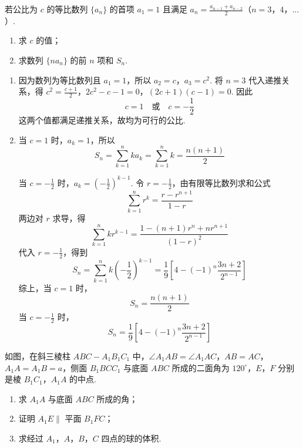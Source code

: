 \begin{problem}
若公比为 \(c\) 的等比数列 \(\{a_{n}\}\) 的首项 \(a_1 = 1\) 且满足 \(a_{n} = \frac{a_{n - 1} + a_{n - 2}}{2}\)（\(n = 3\)，\(4\)，\(\dots\)）.
\begin{enumerate}
\item 求 \(c\) 的值；
\item 求数列 \(\{na_{n}\}\) 的前 \(n\) 项和 \(S_{n}\).
\end{enumerate}
\end{problem}

\begin{solution}
\begin{enumerate}
\item
因为数列为等比数列且 \(a_1=1\)，所以 \(a_2=c\)，\(a_3=c^2\). 将 \(n=3\) 代入递推关系，得
\(c^2=\frac{c+1}{2}\)，\(2c^2-c-1=0\)，\((2c+1)(c-1)=0\).
因此
\[
c=1\quad\text{或}\quad c=-\frac12
\]
这两个值都满足递推关系，故均为可行的公比.

\item
当 \(c=1\) 时，\(a_k=1\)，所以
\[
S_n=\sum_{k=1}^n ka_k=\sum_{k=1}^n k=\frac{n(n+1)}{2}
\]

当 \(c=-\frac12\) 时，\(a_k=\left(-\frac12\right)^{k-1}\). 令 \(r=-\frac12\)，由有限等比数列求和公式
\[
\sum_{k=1}^n r^k=\frac{r-r^{n+1}}{1-r}
\]
两边对 \(r\) 求导，得
\[
\sum_{k=1}^n kr^{k-1}
=\frac{1-(n+1)r^n+nr^{n+1}}{(1-r)^2}
\]
代入 \(r=-\frac12\)，得到
\[
S_n=\sum_{k=1}^n k\left(-\frac12\right)^{k-1}
=\frac{1}{9}\left[4-(-1)^n\frac{3n+2}{2^{n-1}}\right]
\]
综上，当 \(c=1\) 时，
\[
S_n=\frac{n(n+1)}{2}
\]
当 \(c=-\frac12\) 时，
\[
S_n=\frac{1}{9}\left[4-(-1)^n\frac{3n+2}{2^{n-1}}\right]
\]
\end{enumerate}
\end{solution}

\begin{problem}
如图，在斜三棱柱 \(ABC - A_{1}B_{1}C_{1}\) 中，\(\angle A_{1}AB = \angle A_{1}AC\)，\(AB = AC\)，\(A_{1}A = A_{1}B = a\)，侧面 \(B_{1}BCC_{1}\) 与底面 \(ABC\) 所成的二面角为 \(120^{\circ}\)，\(E\)，\(F\) 分别是棱 \(B_{1}C_{1}\)，\(A_{1}A\) 的中点.

\begin{enumerate}
\item 求 \(A_{1}A\) 与底面 \(ABC\) 所成的角；
\item 证明 \(A_{1}E \parallel\) 平面 \(B_{1}FC\)；
\item 求经过 \(A_{1}\)，\(A\)，\(B\)，\(C\) 四点的球的体积.
\end{enumerate}

\end{problem}

